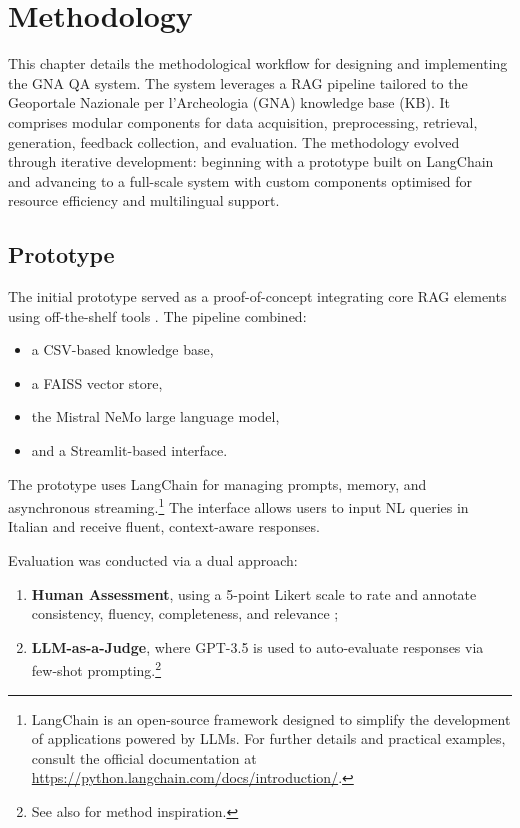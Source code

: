 \chapter{Methodology}
\label{chap:methodology}
\begin{spacing}{1.5}
This chapter details the methodological workflow for designing and implementing the GNA QA system. The system leverages a RAG pipeline tailored to the Geoportale Nazionale per l’Archeologia (GNA) knowledge base (KB). It comprises modular components for data acquisition, preprocessing, retrieval, generation, feedback collection, and evaluation. The methodology evolved through iterative development: beginning with a prototype built on LangChain and advancing to a full-scale system with custom components optimised for resource efficiency and multilingual support.


\section{Prototype}
The initial prototype served as a proof-of-concept integrating core RAG elements using off-the-shelf tools \citep{mishra_using_2024,akkiraju_facts_2024}. The pipeline combined:
\begin{itemize}
      \item a CSV-based knowledge base,
      \item a FAISS vector store,
      \item the Mistral NeMo large language model,
      \item and a Streamlit-based interface.
\end{itemize}

The prototype uses LangChain for managing prompts, memory, and asynchronous streaming.\footnote{LangChain is an open-source framework designed to simplify the development of applications powered by LLMs. For further details and practical examples, consult the official documentation at \url{https://python.langchain.com/docs/introduction/}.} The interface allows users to input NL queries in Italian and receive fluent, context-aware responses.\nocite{noauthor_langchain_2024}

Evaluation was conducted via a dual approach:
\begin{enumerate}
      \item \textbf{Human Assessment}, using a 5-point Likert scale to rate and annotate consistency, fluency, completeness, and relevance \citep{abeysinghe_challenges_2024};
      \item \textbf{LLM-as-a-Judge}, where GPT-3.5 is used to auto-evaluate responses via few-shot prompting.\footnote{See also \citep{svikhnushina_approximating_2023} for method inspiration.}
\end{enumerate}


\end{spacing}
